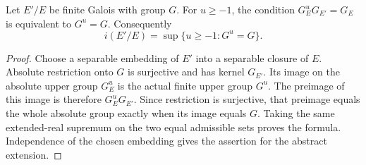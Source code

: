 \begin{lemma}
\label{fw:finite-galois-ramification-bound}
\leanok
Let $E'/E$ be finite Galois with group $G$. For $u\geq-1$, the
condition $G_E^uG_{E'}=G_E$ is equivalent to $G^u=G$. Consequently
\[
 i(E'/E)=\sup\{u\geq-1:G^u=G\}.
\]
\end{lemma}
\begin{proof}
Choose a separable embedding of $E'$ into a separable closure of
$E$. Absolute restriction onto $G$ is surjective and has kernel
$G_{E'}$. Its image on the absolute upper group $G_E^u$ is the
actual finite upper group $G^u$. The preimage of this image is
therefore $G_E^uG_{E'}$. Since restriction is surjective, that
preimage equals the whole absolute group exactly when its image
equals $G$. Taking the same extended-real supremum on the two
equal admissible sets proves the formula. Independence of the
chosen embedding gives the assertion for the abstract extension.
\end{proof}


